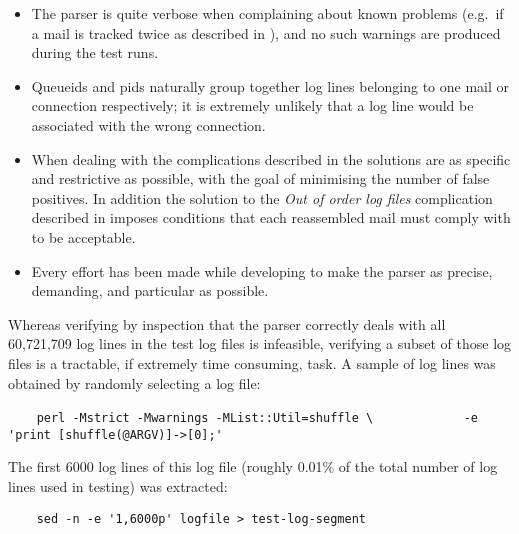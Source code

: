 \begin{itemize}

    \item The parser is quite verbose when complaining about known problems
        (e.g.\ if a mail is tracked twice as described in
        ), and no such warnings are
        produced during the test runs.

    \item Queueids and \glspl{pid} naturally group together log lines
        belonging to one mail or connection respectively; it is extremely
        unlikely that a log line would be associated with the wrong
        connection.

    \item When dealing with the complications described in
         the solutions are as specific and
        restrictive as possible, with the goal of minimising the number of
        false positives.  In addition the solution to the \textit{Out of
        order log files\/} complication described in  imposes conditions that each reassembled mail must
        comply with to be acceptable.

    \item Every effort has been made while developing to make the parser as
        precise, demanding, and particular as possible.

\end{itemize}

Whereas verifying by inspection that the parser correctly deals with all
60,721,709 log lines in the test log files is infeasible, verifying a
subset of those log files is a tractable, if extremely time consuming,
task.  A sample of log lines was obtained by randomly selecting a log file:

\verb!    perl -Mstrict -Mwarnings -MList::Util=shuffle \!\newline{}
\verb!            -e 'print [shuffle(@ARGV)]->[0];'!

The first 6000 log lines of this log file (roughly 0.01\% of the total
number of log lines used in testing) was extracted:

\verb!    sed -n -e '1,6000p' logfile > test-log-segment!

